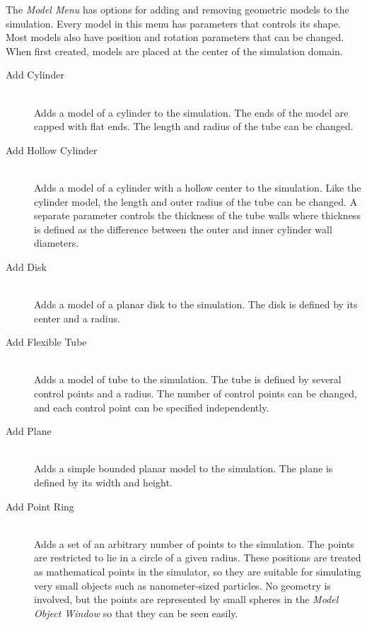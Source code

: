 \documentclass[11pt,titlepage,twoside]{article}
\begin{document}
The \emph{Model Menu} has options for adding and removing geometric models to the simulation. Every model in this menu has parameters that controls its shape. Most models also have position and rotation parameters that can be changed. When first created, models are placed at the center of the simulation domain.

\begin{description}

  \item[Add Cylinder] \hfill \\
  Adds a model of a cylinder to the simulation. The ends of the model are capped with flat ends. The length and radius of the tube can be changed.
  
  \item[Add Hollow Cylinder] \hfill \\
  Adds a model of a cylinder with a hollow center to the simulation. Like the cylinder model, the length and outer radius of the tube can be changed. A separate parameter controls the thickness of the tube walls where thickness is defined as the difference between the outer and inner cylinder wall diameters.

  \item[Add Disk] \hfill \\
  Adds a model of a planar disk to the simulation. The disk is defined by its center and a radius.

  \item[Add Flexible Tube] \hfill \\
  Adds a model of tube to the simulation. The tube is defined by several control points and a radius. The number of control points can be changed, and each control point can be specified independently.
  
  \item[Add Plane] \hfill \\
  Adds a simple bounded planar model to the simulation. The plane is defined by its width and height.
  
  \item[Add Point Ring] \hfill \\
  Adds a set of an arbitrary number of points to the simulation. The points are restricted to lie in a circle of a given radius. These positions are treated as mathematical points in the simulator, so they are suitable for simulating very small objects such as nanometer-sized particles. No geometry is involved, but the points are represented by small spheres in the \emph{Model Object Window} so that they can be seen easily.
  

\end{description}
\end{document}
